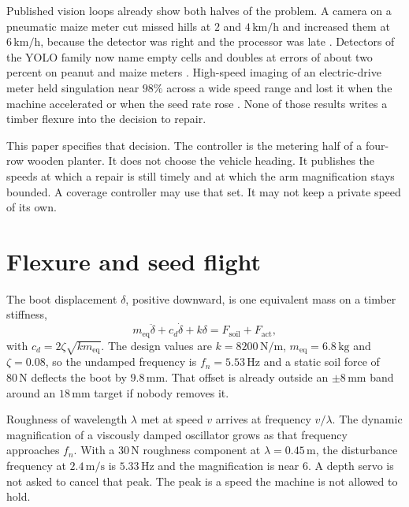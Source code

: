 \documentclass[11pt,a4paper]{article}
\begin{document}
Published vision loops already show both halves of the problem. A camera on a pneumatic maize meter cut missed hills at \(2\) and \(4\,\mathrm{km/h}\) and increased them at \(6\,\mathrm{km/h}\), because the detector was right and the processor was late \cite{borja2018,borja2021}. Detectors of the YOLO family now name empty cells and doubles at errors of about two percent on peanut and maize meters \cite{blaser2024,zhao2025yolo}. High-speed imaging of an electric-drive meter held singulation near \(98\%\) across a wide speed range and lost it when the machine accelerated or when the seed rate rose \cite{mangus2017}. None of those results writes a timber flexure into the decision to repair.

This paper specifies that decision. The controller is the metering half of a four-row wooden planter. It does not choose the vehicle heading. It publishes the speeds at which a repair is still timely and at which the arm magnification stays bounded. A coverage controller may use that set. It may not keep a private speed of its own.

\section{Flexure and seed flight}
The boot displacement \(\delta\), positive downward, is one equivalent mass on a timber stiffness,
\begin{equation}
\label{eq:arm}
m_{\mathrm{eq}}\ddot{\delta}+c_d\dot{\delta}+k\delta=F_{\mathrm{soil}}+F_{\mathrm{act}},
\end{equation}
with \(c_d=2\zeta\sqrt{km_{\mathrm{eq}}}\). The design values are \(k=8200\,\mathrm{N/m}\), \(m_{\mathrm{eq}}=6.8\,\mathrm{kg}\) and \(\zeta=0.08\), so the undamped frequency is \(f_n=5.53\,\mathrm{Hz}\) and a static soil force of \(80\,\mathrm{N}\) deflects the boot by \(9.8\,\mathrm{mm}\). That offset is already outside an \(\pm 8\,\mathrm{mm}\) band around an \(18\,\mathrm{mm}\) target if nobody removes it.

Roughness of wavelength \(\lambda\) met at speed \(v\) arrives at frequency \(v/\lambda\). The dynamic magnification of a viscously damped oscillator grows as that frequency approaches \(f_n\). With a \(30\,\mathrm{N}\) roughness component at \(\lambda=0.45\,\mathrm{m}\), the disturbance frequency at \(2.4\,\mathrm{m/s}\) is \(5.33\,\mathrm{Hz}\) and the magnification is near \(6\). A depth servo is not asked to cancel that peak. The peak is a speed the machine is not allowed to hold.
\end{document}
